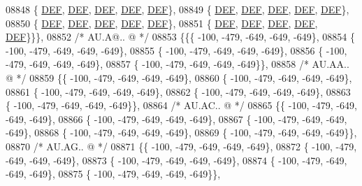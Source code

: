 \begin{DoxyCode}
08848 \{  \mbox{\hyperlink{1_88_84__epars_8h_a397419fc12b37ed479c8abb9d444d843}{DEF}},  \mbox{\hyperlink{1_88_84__epars_8h_a397419fc12b37ed479c8abb9d444d843}{DEF}},  \mbox{\hyperlink{1_88_84__epars_8h_a397419fc12b37ed479c8abb9d444d843}{DEF}},  \mbox{\hyperlink{1_88_84__epars_8h_a397419fc12b37ed479c8abb9d444d843}{DEF}},  \mbox{\hyperlink{1_88_84__epars_8h_a397419fc12b37ed479c8abb9d444d843}{DEF}}\},
08849 \{  \mbox{\hyperlink{1_88_84__epars_8h_a397419fc12b37ed479c8abb9d444d843}{DEF}},  \mbox{\hyperlink{1_88_84__epars_8h_a397419fc12b37ed479c8abb9d444d843}{DEF}},  \mbox{\hyperlink{1_88_84__epars_8h_a397419fc12b37ed479c8abb9d444d843}{DEF}},  \mbox{\hyperlink{1_88_84__epars_8h_a397419fc12b37ed479c8abb9d444d843}{DEF}},  \mbox{\hyperlink{1_88_84__epars_8h_a397419fc12b37ed479c8abb9d444d843}{DEF}}\},
08850 \{  \mbox{\hyperlink{1_88_84__epars_8h_a397419fc12b37ed479c8abb9d444d843}{DEF}},  \mbox{\hyperlink{1_88_84__epars_8h_a397419fc12b37ed479c8abb9d444d843}{DEF}},  \mbox{\hyperlink{1_88_84__epars_8h_a397419fc12b37ed479c8abb9d444d843}{DEF}},  \mbox{\hyperlink{1_88_84__epars_8h_a397419fc12b37ed479c8abb9d444d843}{DEF}},  \mbox{\hyperlink{1_88_84__epars_8h_a397419fc12b37ed479c8abb9d444d843}{DEF}}\},
08851 \{  \mbox{\hyperlink{1_88_84__epars_8h_a397419fc12b37ed479c8abb9d444d843}{DEF}},  \mbox{\hyperlink{1_88_84__epars_8h_a397419fc12b37ed479c8abb9d444d843}{DEF}},  \mbox{\hyperlink{1_88_84__epars_8h_a397419fc12b37ed479c8abb9d444d843}{DEF}},  \mbox{\hyperlink{1_88_84__epars_8h_a397419fc12b37ed479c8abb9d444d843}{DEF}},  \mbox{\hyperlink{1_88_84__epars_8h_a397419fc12b37ed479c8abb9d444d843}{DEF}}\}\}\},
08852 \textcolor{comment}{/* AU.A@.. @ */}
08853 \{\{\{ -100, -479, -649, -649, -649\},
08854 \{ -100, -479, -649, -649, -649\},
08855 \{ -100, -479, -649, -649, -649\},
08856 \{ -100, -479, -649, -649, -649\},
08857 \{ -100, -479, -649, -649, -649\}\},
08858 \textcolor{comment}{/* AU.AA.. @ */}
08859 \{\{ -100, -479, -649, -649, -649\},
08860 \{ -100, -479, -649, -649, -649\},
08861 \{ -100, -479, -649, -649, -649\},
08862 \{ -100, -479, -649, -649, -649\},
08863 \{ -100, -479, -649, -649, -649\}\},
08864 \textcolor{comment}{/* AU.AC.. @ */}
08865 \{\{ -100, -479, -649, -649, -649\},
08866 \{ -100, -479, -649, -649, -649\},
08867 \{ -100, -479, -649, -649, -649\},
08868 \{ -100, -479, -649, -649, -649\},
08869 \{ -100, -479, -649, -649, -649\}\},
08870 \textcolor{comment}{/* AU.AG.. @ */}
08871 \{\{ -100, -479, -649, -649, -649\},
08872 \{ -100, -479, -649, -649, -649\},
08873 \{ -100, -479, -649, -649, -649\},
08874 \{ -100, -479, -649, -649, -649\},
08875 \{ -100, -479, -649, -649, -649\}\},

\end{DoxyCode}
